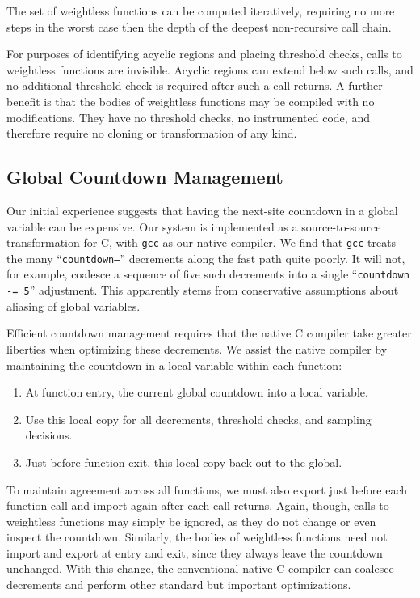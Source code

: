 The set of weightless functions can be computed iteratively, requiring
no more steps in the worst case then the depth of the deepest
non-recursive call chain.

For purposes of identifying acyclic regions and placing threshold
checks, calls to weightless functions are invisible.  Acyclic regions
can extend below such calls, and no additional threshold check is
required after such a call returns.  A further benefit is that the
bodies of weightless functions may be compiled with no modifications.
They have no threshold checks, no instrumented code, and therefore
require no cloning or transformation of any kind.

\subsection{Global Countdown Management}

Our initial experience suggests that having the next-site countdown in
a global variable can be expensive.  Our system is implemented as a
source-to-source transformation for C, with \texttt{gcc} as our native
compiler.  We find that \texttt{gcc} treats the many
``\texttt{countdown--}'' decrements along the fast path quite poorly.
It will not, for example, coalesce a sequence of five such decrements
into a single ``\texttt{countdown -= 5}'' adjustment.  This apparently
stems from conservative assumptions about aliasing of global
variables.

Efficient countdown management requires that the native C compiler
take greater liberties when optimizing these decrements.  We assist
the native compiler by maintaining the countdown in a local variable
within each function:

\begin{enumerate}
\item At function entry,  the current global countdown
  into a local variable.
\item Use this local copy for all decrements, threshold checks, and
  sampling decisions.
\item Just before function exit,  this local copy back
  out to the global.
\end{enumerate}

To maintain agreement across all functions, we must also
export just before each function call and import again after each call
returns.  Again, though, calls to weightless functions may simply be
ignored, as they do not change or even inspect the countdown.
Similarly, the bodies of weightless functions need not import and
export at entry and exit, since they always leave the countdown
unchanged.  With this change, the conventional native C compiler can
coalesce decrements and perform other standard but important
optimizations.

